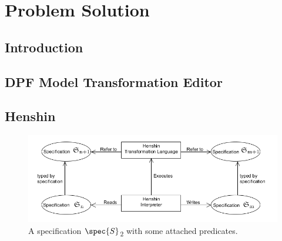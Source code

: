 
\chapter{Problem Solution} %

\label{Chapter6} %



\section{Introduction}

\section{DPF Model Transformation Editor}

\section{Henshin}

\begin{figure}[H]
	\centering
	\includegraphics[scale=0.7]{./Figures/TransformationSolutionBasic.png}
	\caption[A specification and some predefined diagrammatic predicate attached]
	{A specification $\spec{S}$\textsubscript{2} with some attached predicates.}
	\label{fig:Simple_Solution}
\end{figure}

